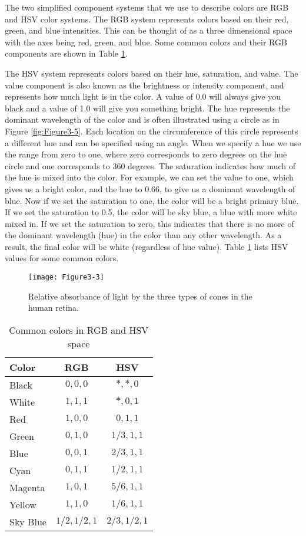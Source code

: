 The two simplified component systems that we use to describe colors are RGB and HSV color systems. The RGB system represents colors based on their red, green, and blue intensities. This can be thought of as a three dimensional space with the axes being red, green, and blue. Some common colors and their RGB components are shown in Table \ref{table:Figure3-4}.

The HSV system represents colors based on their hue, saturation, and value. The value component is also known as the brightness or intensity component, and represents how much light is in the color. A value of 0.0 will always give you black and a value of 1.0 will give you something bright. The hue represents the dominant wavelength of the color and is often illustrated using a circle as in Figure \ref{fig:Figure3-5}. Each location on the circumference of this circle represents a different hue and can be specified using an angle. When we specify a hue we use the range from zero to one, where zero corresponds to zero degrees on the hue circle and one corresponds to 360 degrees. The saturation indicates how much of the hue is mixed into the color. For example, we can set the value to one, which gives us a bright color, and the hue to 0.66, to give us a dominant wavelength of blue. Now if we set the saturation to one, the color will be a bright primary blue. If we set the saturation to 0.5, the color will be sky blue, a blue with more white mixed in. If we set the saturation to zero, this indicates that there is no more of the dominant wavelength (hue) in the color than any other wavelength. As a result, the final color will be white (regardless of hue value). Table \ref{table:Figure3-4} lists HSV values for some common colors.

\begin{figure}[!htb]
  \centering
  \texttt{[image: Figure3-3]}\\
  \caption{Relative absorbance of light by the three types of cones in the human retina.}\label{fig:Figure3-3}
\end{figure}

\begin{table}
	\centering
    \begin{tabular}{ | l | c | c | }
    \hline
    Color & RGB & HSV\\
    \hline
    Black & $0,0,0$ & $\ast,\ast,0$\\
    White & $1,1,1$ & $\ast,0,1$\\
    Red & $1,0,0$ & $0,1,1$\\
    Green & $0,1,0$ & $1/3,1,1$\\
    Blue & $0,0,1$ & $2/3,1,1$\\
    Cyan & $0,1,1$ & $1/2,1,1$\\
    Magenta & $1,0,1$ & $5/6,1,1$\\
    Yellow & $1,1,0$ & $1/6,1,1$\\
    Sky Blue & $1/2,1/2,1$ & $2/3,1/2,1$\\
    \hline
    \end{tabular}
    \caption{Common colors in RGB and HSV space}\label{table:Figure3-4}
\end{table}
  
